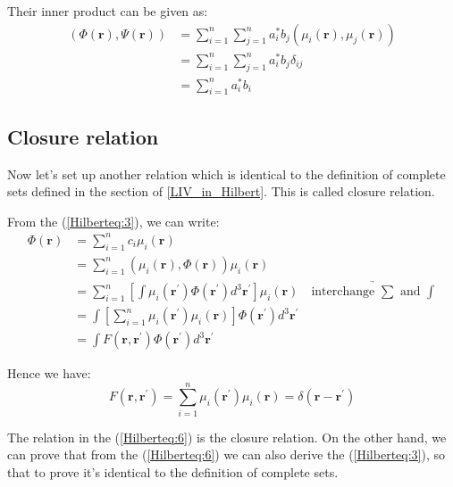 Their inner product can be given as:
\begin{align}
\label{Hilberteq:13}
  (\Phi(\mathbf{r}), \Psi(\mathbf{r})) &=
  \sum_{i=1}^{n}\sum_{j=1}^{n}a^{*}_{i}b_{j} (\mu_{i}(\mathbf{r}),
  \mu_{j}(\mathbf{r})) \nonumber \\
  &=  \sum_{i=1}^{n}\sum_{j=1}^{n}a^{*}_{i}b_{j}\delta_{ij} \nonumber \\
  &=  \sum_{i=1}^{n}a^{*}_{i}b_{i}
\end{align}


\subsection{Closure relation}
\label{sec:CR_in_Hilbert}

Now let's set up another relation which is identical to the definition
of complete sets defined in the section of \ref{LIV_in_Hilbert}. This
is called closure relation.

From the (\ref{Hilberteq:3}), we can write:
\begin{align}
\label{Hilberteq:15}
  \Phi(\mathbf{r}) &= \sum_{i=1}^{n}c_{i}\mu_{i}(\mathbf{r}) \nonumber
  \\
&= \sum_{i=1}^{n}(\mu_{i}(\mathbf{r}),
  \Phi(\mathbf{r}))\mu_{i}(\mathbf{r}) \nonumber \\
&= \sum_{i=1}^{n}\left[ \int
\mu_{i}(\mathbf{r}^{'})\Phi(\mathbf{r}^{'})d^{3}\mathbf{r}^{'}
\right]\mu_{i}(\mathbf{r}) \quad
\underrightarrow{\text{interchange $\sum$ and $\int$}} \nonumber \\
&= \int
\left[ \sum_{i=1}^{n}
\mu_{i}(\mathbf{r}^{'})\mu_{i}(\mathbf{r})\right]
\Phi(\mathbf{r}^{'})d^{3}\mathbf{r}^{'} \nonumber \\
&= \int F(\mathbf{r}, \mathbf{r}^{'})\Phi(\mathbf{r}^{'})d^{3}\mathbf{r}^{'}
\end{align}

Hence we have:
\begin{equation}
  \label{Hilberteq:6}
  F(\mathbf{r}, \mathbf{r}^{'}) = \sum_{i=1}^{n}
\mu_{i}(\mathbf{r}^{'})\mu_{i}(\mathbf{r}) = \delta (\mathbf{r}
-\mathbf{r}^{'})
\end{equation}

The relation in the (\ref{Hilberteq:6}) is the closure relation. On
the other hand, we can prove that from the (\ref{Hilberteq:6}) we can
also derive the (\ref{Hilberteq:3})\cite{Coden}, so that to prove it's
identical to the definition of complete sets.

